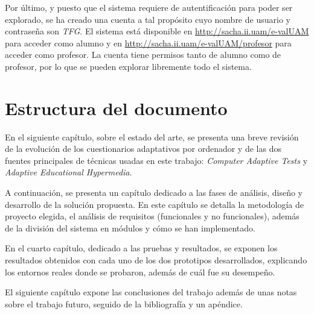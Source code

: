 Por último, y puesto que el sistema requiere de autentificación para poder ser explorado, se ha creado una cuenta a tal propósito cuyo nombre de usuario y contraseña son \textit{TFG}. El sistema está disponible en \url{http://sacha.ii.uam/e-valUAM} para acceder como alumno y en \url{http://sacha.ii.uam/e-valUAM/profesor} para acceder como profesor. La cuenta tiene permisos tanto de alumno como de profesor, por lo que se pueden explorar libremente todo el sistema.

\section{Estructura del documento}

En el siguiente capítulo, sobre el estado del arte, se presenta una breve revisión de la evolución de los cuestionarios adaptativos por ordenador y de las dos fuentes principales de técnicas usadas en este trabajo: \textit{Computer Adaptive Tests} y \textit{Adaptive Educational Hypermedia}.

A continuación, se presenta un capítulo dedicado a las fases de análisis, diseño y desarrollo de la solución propuesta. En este capítulo se detalla la metodología de proyecto elegida, el análisis de requisitos (funcionales y no funcionales), además de la división del sistema en módulos y cómo se han implementado.

En el cuarto capítulo, dedicado a las pruebas y resultados, se exponen los resultados obtenidos con cada uno de los dos prototipos desarrollados, explicando los entornos reales donde se probaron, además de cuál fue su desempeño.

El siguiente capítulo expone las conclusiones del trabajo además de unas notas sobre el trabajo futuro, seguido de la bibliografía y un apéndice. %

